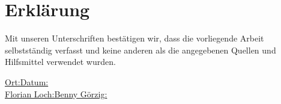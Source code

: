 \documentclass[a4,12pt,ngerman,listof=numbered]{scrartcl}
\newcommand*{\qqquad}{\qquad\qquad\qquad\qquad}
\begin{document}


\newif\ifsigned
\signedtrue

\ifsigned
	\newpage
	\section*{Erklärung}
	Mit unseren Unterschriften bestätigen wir, dass die vorliegende Arbeit selbstständig verfasst und keine anderen als die angegebenen Quellen und Hilfsmittel verwendet wurden.\\
	
	\begin{flushleft}
		\uline{Ort:\qqquad\qqquad}\quad\uline{Datum:\qqquad\qqquad}\\
		\vspace{1cm}
		\uline{Florian Loch:\qqquad\qquad\qquad}\quad\uline{Benny Görzig:\qqquad\qquad\quad}
	\end{flushleft}
	\vfill
	\newpage
\fi

\tableofcontents

\newpage



\newpage



\newpage



\newpage



\newpage



\newpage

\appendix	


\end{document}
